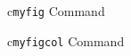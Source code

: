 \begin{myslide}{c}{\lstinline{myfig} Command}


\end{myslide}

\begin{myslide}{c}{\lstinline{myfigcol} Command}

\begin{columns}

\begin{column}{0.7\textwidth}
\lipsum[66]
\end{column}


\end{columns}

\begin{columns}[t]




\end{columns}

\end{myslide}

